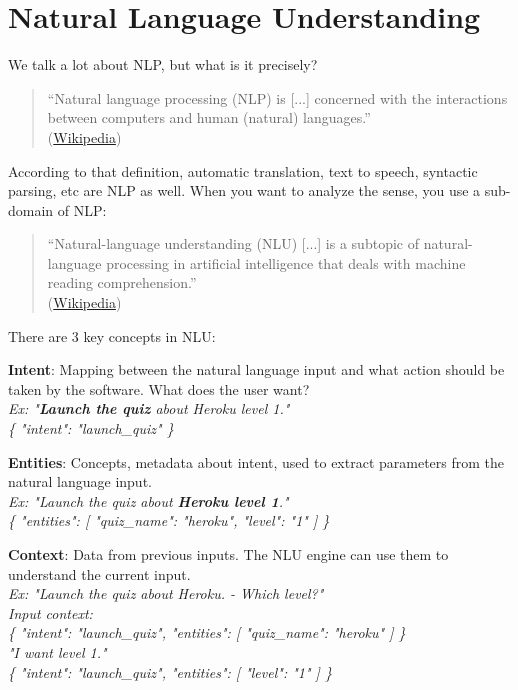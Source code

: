 \documentclass{article}
\begin{document}
\section{Natural Language Understanding}
We talk a lot about NLP, but what is it precisely?
\begin{quote}
“Natural language processing (NLP) is [...] concerned with the interactions between computers and human (natural) languages.” \\
(\href{https://en.wikipedia.org/wiki/Natural_language_processing}{Wikipedia})
\end{quote}
According to that definition, automatic translation, text to speech, syntactic parsing, etc are NLP as well. When you want to analyze the sense, you use a sub-domain of NLP:
\begin{quote}
“Natural-language understanding (NLU) [...] is a subtopic of natural-language processing in artificial intelligence that deals with machine reading comprehension.”\\
(\href{https://en.wikipedia.org/wiki/Natural-language_understanding}{Wikipedia})
\end{quote}
There are 3 key concepts in NLU:
\begin{description}
    \item \textbf{Intent}: Mapping between the natural language input and what action should be taken by the software. What does the user want?\\
        \textit{Ex: "\textbf{Launch the quiz} about Heroku level 1."\\
            \hspace*{3pt} \{ "intent": "launch\_quiz" \} }
    \item \textbf{Entities}: Concepts, metadata about intent, used to extract parameters from the natural language input.\\
        \textit{Ex: "Launch the quiz about \textbf{Heroku level 1}."\\
           \hspace*{3pt} \{ "entities": [ "quiz\_name": "heroku", "level": "1" ] \} }
    \item \textbf{Context}: Data from previous inputs. The NLU engine can use them to understand the current input.\\
        \textit{Ex: "Launch the quiz about Heroku. - Which level?"\\
            Input context:\\ \hspace*{8pt} \{ "intent": "launch\_quiz", "entities": [ "quiz\_name": "heroku" ] \} \\
            "I want level 1."\\
            \hspace*{3pt} \{ "intent": "launch\_quiz", "entities": [ "level": "1" ] \}}
\end{description}
\end{document}
